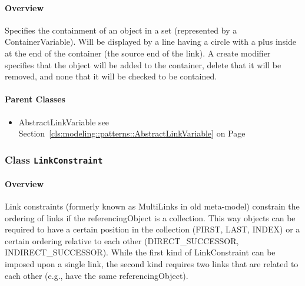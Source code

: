 \paragraph{Overview}

	
			
Specifies the containment of an object in a set (represented by a ContainerVariable). Will be displayed by a line having a circle with a plus inside at the end of the container (the source end of the link). A create modifier specifies that the object will be added to the container, delete that it will be removed, and none that it will be checked to be contained.	
		
	



\paragraph{Parent Classes}
\begin{itemize}
\item AbstractLinkVariable see Section~\ref{cls:modeling::patterns::AbstractLinkVariable} on Page~\pageref{cls:modeling::patterns::AbstractLinkVariable}\end{itemize}
\subsubsection{\Large{Class \bfseries \texttt{LinkConstraint}\normalfont}}
\label{cls:modeling::patterns::LinkConstraint} 
\paragraph{Overview}

	
			
Link constraints (formerly known as MultiLinks in old meta-model) constrain the ordering of links if the referencingObject is a collection. This way objects can be required to have a certain position in the collection (FIRST, LAST, INDEX) or a certain ordering relative to each other (DIRECT\_SUCCESSOR, INDIRECT\_SUCCESSOR). While the first kind of LinkConstraint can be imposed upon a single link, the second kind requires two links that are related to each other (e.g., have the same referencingObject).	
		
	


